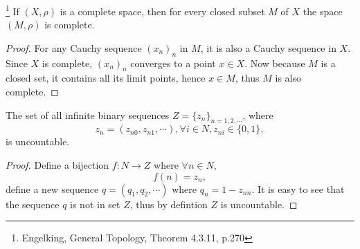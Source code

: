 \begin{proposition} \label{P:closed_complete}
  \footnote{Engelking, General Topology, Theorem 4.3.11, p.270}
If $(X,\rho)$ is a complete space, then for every closed subset $M$ of $X$ the
space $(M,\rho)$ is complete.
\end{proposition}
\begin{proof}
For any Cauchy sequence $(x_n)_n$ in $M$, it is also a Cauchy sequence in $X$.
Since $X$ is complete, $(x_n)_n$ converges to a point $x\in X$. Now because
$M$ is a closed set, it contains all its limit points, hence $x\in M$, thus
$M$ is also complete.
\end{proof}

\begin{lemma} \label{L:binary_seq}
The set of all infinite binary sequences $Z=\{ z_n \}_{n=1,2,\cdots}$, where
\[
  z_n = (z_{n0}, z_{n1}, \cdots),  \forall i\in N, z_{ni}\in \{0,1\},
\]
is uncountable.
\end{lemma}
\begin{proof}
Define a bijection $f:N\to Z$ where $\forall n\in N$,
\[
  f(n) = z_n,
\]
define a new sequence $q=(q_1, q_2, \cdots)$ where
$q_n=1-z_{nn}$. It is easy to see that the sequence $q$ is not in set $Z$, thus
by defintion $Z$ is uncountable.
\end{proof}

